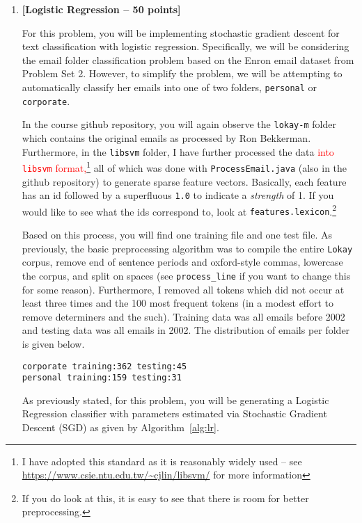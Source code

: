 \documentclass[12pt,letterpaper]{article}
\newcommand{\red}[1]{\textcolor{red}{#1}}
\begin{document}
\begin{enumerate}
\item
{\bf [Logistic Regression -- 50 points]}

For this problem, you will be implementing stochastic gradient descent for text classification with logistic regression.  Specifically, we will be considering the email folder classification problem based on the Enron email dataset from Problem Set 2.  However, to simplify the problem, we will be attempting to automatically classify her emails into one of two folders, {\tt personal} or {\tt corporate}.

In the course github repository, you will again observe the {\tt lokay-m} folder which contains the original emails as processed by Ron Bekkerman.  Furthermore, in the {\tt libsvm} folder, I have further processed the data \red{into {\tt libsvm} format,}\footnote{I have adopted this standard as it is reasonably widely used -- see \url{https://www.csie.ntu.edu.tw/~cjlin/libsvm/} for more information} all of which was done with {\tt ProcessEmail.java} (also in the github repository) to generate sparse feature vectors.  Basically, each feature has an id followed by a superfluous {\tt 1.0} to indicate a {\em strength} of 1.  If you would like to see what the ids correspond to, look at {\tt features.lexicon}.\footnote{If you do look at this, it is easy to see that there is room for better preprocessing.}

Based on this process, you will find one training file and one test file.
As previously, the basic preprocessing algorithm was to compile the entire {\tt Lokay} corpus, remove end of sentence periods and oxford-style commas, lowercase the corpus, and split on spaces (see {\tt process\_line} if you want to change this for some reason).  Furthermore, I removed all tokens which did not occur at least three times and the 100 most frequent tokens (in a modest effort to remove determiners and the such).  Training data was all emails before 2002 and testing data was all emails in 2002.  The distribution of emails per folder is given below.

\begin{verbatim}
corporate training:362 testing:45
personal training:159 testing:31
\end{verbatim}

As previously stated, for this problem, you will be generating a Logistic Regression classifier with parameters estimated via Stochastic Gradient Descent (SGD) as given by Algorithm~\ref{alg:lr}.


\end{enumerate}
\end{document}

